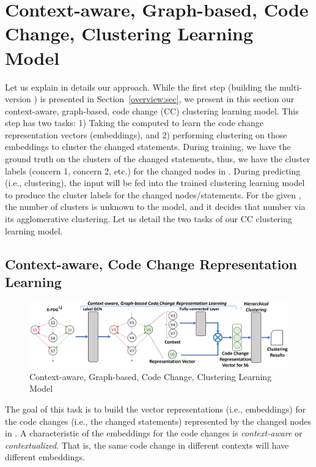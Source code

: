 \section{Context-aware, Graph-based, Code Change, Clustering Learning Model}
\label{clustering-model:sec}

Let us explain in details our approach. While the first step (building
the multi-version {\mvpdg}) is presented in
Section~\ref{overview:sec}, we present in this section our
context-aware, graph-based, code change (CC) clustering learning
model.  This step has two tasks: 1) Taking the computed {\mvpdg} to
learn the code change representation vectors (embeddings), and 2)
performing clustering on those embeddings to cluster the changed
statements.  During training, we have the ground truth on the clusters
of the changed statements, thus, we have the cluster labels (concern
1, concern 2, etc.) for the changed nodes in {\mvpdg}. During
predicting (i.e., clustering), the input {\mvpdg} will be fed into the
trained clustering learning model to produce the cluster labels for
the changed nodes/statements. For the given {\mvpdg}, the number of
clusters is unknown to the model, and it decides that number via its
agglomerative clustering. Let us detail the two tasks of our CC
clustering learning model.



\subsection{Context-aware, Code Change Representation Learning}
\label{vector:sec}

\begin{figure}[t]
	\centering \includegraphics[width=5.8in]{figures/STEP_2-new.png}
	\vspace{-6pt}
	\caption{Context-aware, Graph-based, Code Change, Clustering Learning Model}
	\label{fig:step-2}
\end{figure}

The goal of this task is to build the vector representations (i.e.,
embeddings) for the code changes (i.e., the changed statements)
represented by the changed nodes in {\mvpdg}. A characteristic of the
embeddings for the code changes is {\em context-aware} or {\em
  contextualized}. That is, the same code change in different contexts
will have different embeddings.

